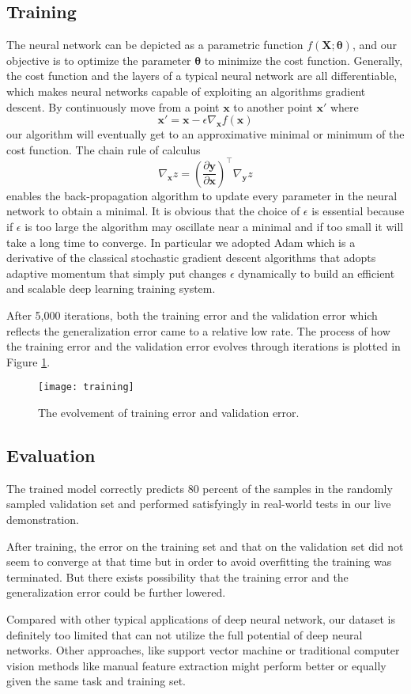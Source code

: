 \subsection{Training}
The neural network can be depicted as a parametric function $f(\boldsymbol{X};\boldsymbol{\theta})$, and our objective is to optimize the parameter $\boldsymbol{\theta}$ to minimize the cost function. Generally, the cost function and the layers of a typical neural network are all differentiable, which makes neural networks capable of exploiting an algorithms gradient descent. By continuously move from a point $\boldsymbol{x}$ to another point $\boldsymbol{x}'$ where
\[
\boldsymbol{x}' = \boldsymbol{x} - \epsilon\nabla_{\boldsymbol{x}}f(\boldsymbol{x})
\]
our algorithm will eventually get to an approximative minimal or minimum of the cost function. The chain rule of calculus
\[
    \nabla_{\boldsymbol{x}}z = (\frac{\partial{\boldsymbol{y}}} {\partial{\boldsymbol{x}}})^\top\nabla_{\boldsymbol{y}}z
\]
enables the back-propagation algorithm to update every parameter in the neural network to obtain a minimal. It is obvious that the choice of $\epsilon$ is essential because if $\epsilon$ is too large the algorithm may oscillate near a minimal and if too small it will take a long time to converge. In particular we adopted Adam\cite{chilimbi2014project} which is a derivative of the classical stochastic gradient descent algorithms that adopts adaptive momentum that simply put changes $\epsilon$ dynamically to build an efficient and scalable deep learning training system.

After 5,000 iterations, both the training error and the validation error which reflects the generalization error came to a relative low rate. The process of how the training error and the validation error evolves through iterations is plotted in Figure \ref{fig:training}.
\begin{figure}[htbp]
    \centering
    \texttt{[image: training]}
    \caption{The evolvement of training error and validation error.}
    \label{fig:training}
\end{figure}
\subsection{Evaluation}
The trained model correctly predicts 80 percent of the samples in the randomly sampled validation set and performed satisfyingly in real-world tests in our live demonstration.

After training, the error on the training set and that on the validation set did not seem to converge at that time but in order to avoid overfitting the training was terminated. But there exists possibility that the training error and the generalization error could be further lowered.

Compared with other typical applications of deep neural network, our dataset is definitely too limited that can not utilize the full potential of deep neural networks. Other approaches, like support vector machine\cite{boser1992training} or traditional computer vision methods like manual feature extraction might perform better or equally given the same task and training set.
